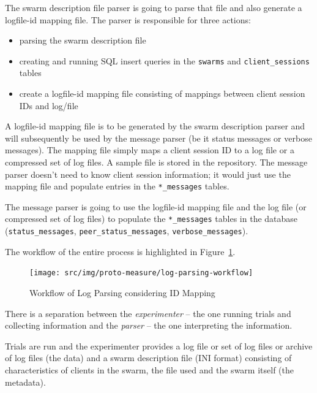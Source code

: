 The swarm description file parser is going to parse that file and also generate a logfile-id mapping file. The parser is responsible for three actions:
\begin{itemize}
  \item parsing the swarm description file
  \item creating and running SQL insert queries in the \texttt{swarms} and
  \texttt{client\_sessions} tables
  \item create a logfile-id mapping file consisting of mappings between client
  session IDs and log/file
\end{itemize}

A logfile-id mapping file is to be generated by the swarm description parser
and will subsequently be used by the message parser (be it status messages or
verbose messages). The mapping file simply maps a client session ID to a log
file or a compressed set of log files. A sample file is stored in the
repository.
The message parser doesn't need to know client session information; it would
just use the mapping file and populate entries in the \texttt{*\_messages}
tables.

The message parser is going to use the logfile-id mapping file and the log
file (or compressed set of log files) to populate the \texttt{*\_messages}
tables in the database (\texttt{status\_messages},
\texttt{peer\_status\_messages}, \texttt{verbose\_messages}).

The workflow of the entire process is highlighted in
Figure~\ref{fig:proto-measure:log-parsing-workflow}.

\begin{figure}[htb]
  \begin{center}
    \texttt{[image: src/img/proto-measure/log-parsing-workflow]}
  \end{center}
  \caption{Workflow of Log Parsing considering ID Mapping}
  \label{fig:proto-measure:log-parsing-workflow}
\end{figure}

There is a separation between the \textit{experimenter} -- the one running
trials and collecting information and the \textit{parser} -- the one
interpreting the information.

Trials are run and the experimenter provides a log file or set of log files or
archive of log files (the data) and a swarm description file (INI format)
consisting of characteristics of clients in the swarm, the file used and the
swarm itself (the metadata).

